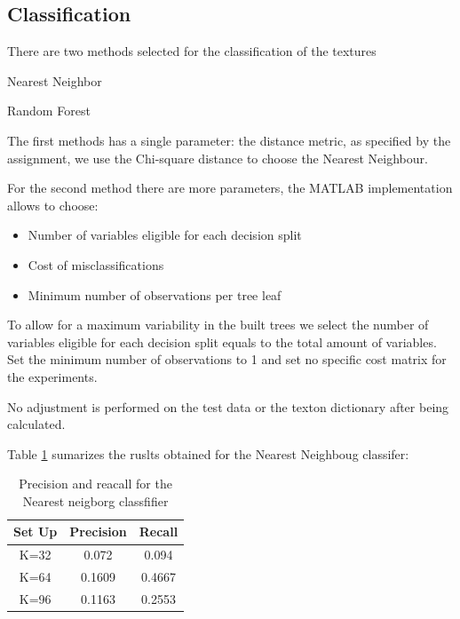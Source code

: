 \documentclass[a4paper]{article}
\begin{document}
\subsection{Classification}
There are two methods selected for the classification of the textures

\begin{description}

\item[Nearest Neighbor] \cite{}
\item[Random Forest] \cite{}

\end{description}

The first methods has a single parameter: the distance metric, as specified by the assignment, we use the Chi-square distance to choose the Nearest Neighbour.

For the second method there are more parameters, the MATLAB implementation allows to choose:

\begin{itemize}
	\item Number of variables eligible for each decision split
	\item Cost of misclassifications
	\item Minimum number of observations per tree leaf
\end{itemize}

To allow for a maximum variability in the built trees we select the number of variables eligible for each decision split equals to the total amount of variables. Set the minimum number of observations to 1 and set no specific cost matrix for the experiments.

No adjustment is performed on the test data or the texton dictionary after being calculated.

Table \ref{table:table1} sumarizes the ruslts obtained for the Nearest Neighboug classifer:


\begin{table}[t]
\centering
\begin{tabular}{c | c | c}
Set Up & Precision & Recall   \\
\hline	
K=32 & 0.072 & 0.094 \\
K=64 & 0.1609 & 0.4667 \\
K=96 &  0.1163&  0.2553 \\

\end{tabular}
\caption{Precision and reacall for the Nearest neigborg classfifier}
\label{table:table1}
\end{table}
\end{document}
